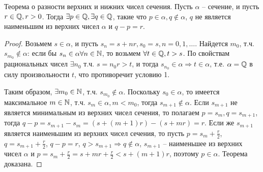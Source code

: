 \documentclass[main]{subfiles}
\begin{document}
\begin{theorem}
    Теорема о разности верхних и нижних чисел сечения. Пусть $\alpha$ -- сечение,
    и пусть $r \in \mathbb{Q}, r > 0$. Тогда $\exists p \in \mathbb{Q}, \exists q \in \mathbb{Q}$,
    такие что $p \in \alpha, q \notin \alpha$, $q$ не является наименьшим из
    верхних чисел $\alpha$ и $q - p = r$.
\end{theorem}
\begin{proof}
    Возьмем $s \in \alpha$, и пусть $s_n = s + nr, s_0 = s, n = 0, 1, \ldots$.
    Найдется $m_0$, т.ч. $s_{m_0} \notin \alpha$: если бы $s_n \in \alpha
        \forall n \in \mathbb{N}$, то возьмем $\forall t \in \mathbb{Q}, t > s$. По свойствам
    рациональных чисел $\exists n_0$ т.ч. $s = n_0r > t$, и тогда
    $s_{n_0} \in \alpha \Rightarrow t \in \alpha$, т.е. $\alpha = \mathbb{Q}$ в силу
    произвольности $t$, что противоречит условию 1.

    Таким образом, $\exists m_0 \in \mathbb{N}$, т.ч. $s_{m_0} \notin \alpha$.
    Поскольку $s_0 \in \alpha$, то имеется максимальное $m \in \mathbb{N}$, т.ч.
    $s_m \in \alpha, m < m_0$, тогда $s_{m + 1} \notin \alpha$.
    Если $s_{m + 1}$ не является минимальным из верхних чисел сечения,
    то полагаем $p = s_m, q = s_{m+1}$, тогда $q - p = s_{m + 1} - s_m =
        (s + (m + 1)r) - (s + mr) = r$. Если же $s_{m + 1}$ является наименьшим
    из верхних чисел сечения, то пусть $p = s_m + \frac{r}{2}$,
    $q = s_{m + 1} + \frac{r}{2}$, $q - p = r$, $q > s_{m + 1} \Rightarrow
        q \notin \alpha$, $s_{m + 1}$ -- наименьшее из верхних чисел $\alpha$ и
    $p = s_m + \frac{r}{2} = s + mr + \frac{r}{2} < s + (m + 1)r$, поэтому
    $p \in \alpha$. Теорема доказана.
\end{proof}
\end{document}
